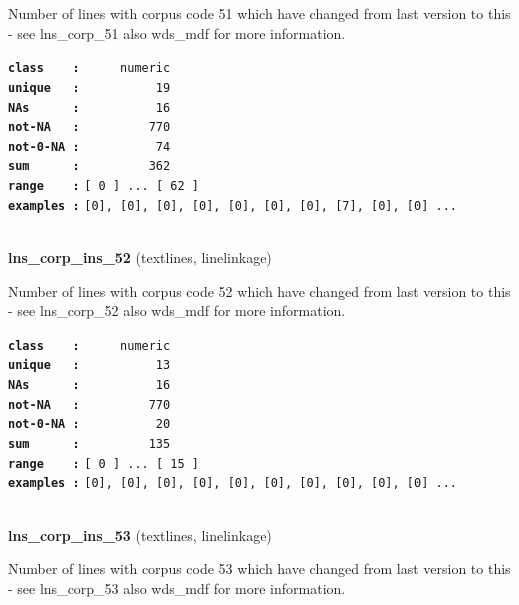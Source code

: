 \documentclass[]{article}
\begin{document}
Number of lines with corpus code 51 which have changed from last version
to this - see lns\_corp\_51 also wds\_mdf for more information.

\textbf{\texttt{class\ \ \ \ :}} \texttt{~~~~~numeric}\\
\textbf{\texttt{unique\ \ \ :}} \texttt{~~~~~~~~~~19}\\
\textbf{\texttt{NAs\ \ \ \ \ \ :}} \texttt{~~~~~~~~~~16}\\
\textbf{\texttt{not-NA\ \ \ :}} \texttt{~~~~~~~~~770}\\
\textbf{\texttt{not-0-NA\ :}} \texttt{~~~~~~~~~~74}\\
\textbf{\texttt{sum\ \ \ \ \ \ :}} \texttt{~~~~~~~~~362}\\
\textbf{\texttt{range\ \ \ \ :}}
\texttt{{[}\ 0\ {]}\ ...\ {[}\ 62\ {]}}\\
\textbf{\texttt{examples\ :}}
\texttt{{[}0{]},\ {[}0{]},\ {[}0{]},\ {[}0{]},\ {[}0{]},\ {[}0{]},\ {[}0{]},\ {[}7{]},\ {[}0{]},\ {[}0{]}\ ...}\\

~

\textbf{lns\_corp\_ins\_52} (textlines, linelinkage)

Number of lines with corpus code 52 which have changed from last version
to this - see lns\_corp\_52 also wds\_mdf for more information.

\textbf{\texttt{class\ \ \ \ :}} \texttt{~~~~~numeric}\\
\textbf{\texttt{unique\ \ \ :}} \texttt{~~~~~~~~~~13}\\
\textbf{\texttt{NAs\ \ \ \ \ \ :}} \texttt{~~~~~~~~~~16}\\
\textbf{\texttt{not-NA\ \ \ :}} \texttt{~~~~~~~~~770}\\
\textbf{\texttt{not-0-NA\ :}} \texttt{~~~~~~~~~~20}\\
\textbf{\texttt{sum\ \ \ \ \ \ :}} \texttt{~~~~~~~~~135}\\
\textbf{\texttt{range\ \ \ \ :}}
\texttt{{[}\ 0\ {]}\ ...\ {[}\ 15\ {]}}\\
\textbf{\texttt{examples\ :}}
\texttt{{[}0{]},\ {[}0{]},\ {[}0{]},\ {[}0{]},\ {[}0{]},\ {[}0{]},\ {[}0{]},\ {[}0{]},\ {[}0{]},\ {[}0{]}\ ...}\\

~

\textbf{lns\_corp\_ins\_53} (textlines, linelinkage)

Number of lines with corpus code 53 which have changed from last version
to this - see lns\_corp\_53 also wds\_mdf for more information.
\end{document}
